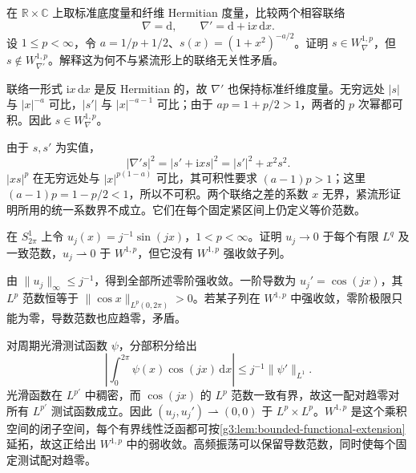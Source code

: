 \begin{exercise}\label{g3:ex:noncompact-connection-sobolev}
	在 \(\mathbb R\times\mathbb C\) 上取标准底度量和纤维 Hermitian 度量，比较两个相容联络
	\[
		\nabla=\mathrm d,\qquad\nabla'=\mathrm d+\mathrm i x\,\mathrm dx.
	\]
	设 \(1\le p<\infty\)，令 \(a=1/p+1/2\)、\(s(x)=(1+x^2)^{-a/2}\)。证明 \(s\in W^{1,p}_\nabla\)，但 \(s\notin W^{1,p}_{\nabla'}\)。解释这为何不与紧流形上的联络无关性矛盾。
\end{exercise}
\begin{solution}
	联络一形式 \(\mathrm ix\,\mathrm dx\) 是反 Hermitian 的，故 \(\nabla'\) 也保持标准纤维度量。无穷远处 \(|s|\) 与 \(|x|^{-a}\) 可比，\(|s'|\) 与 \(|x|^{-a-1}\) 可比；由于 \(ap=1+p/2>1\)，两者的 \(p\) 次幂都可积。因此 \(s\in W^{1,p}_\nabla\)。

	由于 \(s,s'\) 为实值，
	\[
		|\nabla's|^2=|s'+\mathrm ixs|^2=|s'|^2+x^2s^2.
	\]
	\(|xs|^p\) 在无穷远处与 \(|x|^{p(1-a)}\) 可比，其可积性要求 \((a-1)p>1\)；这里 \((a-1)p=1-p/2<1\)，所以不可积。两个联络之差的系数 \(x\) 无界，紧流形证明所用的统一系数界不成立。它们在每个固定紧区间上仍定义等价范数。
\end{solution}

\begin{exercise}\label{g3:ex:weak-strong-oscillation}
	在 \(S^1_{2\pi}\) 上令 \(u_j(x)=j^{-1}\sin(jx)\)，\(1<p<\infty\)。证明 \(u_j\to0\) 于每个有限 \(L^q\) 及一致范数，\(u_j\rightharpoonup0\) 于 \(W^{1,p}\)，但它没有 \(W^{1,p}\) 强收敛子列。
\end{exercise}
\begin{solution}
	由 \(\|u_j\|_\infty\le j^{-1}\)，得到全部所述零阶强收敛。一阶导数为 \(u_j'=\cos(jx)\)，其 \(L^p\) 范数恒等于 \(\|\cos x\|_{L^p(0,2\pi)}>0\)。若某子列在 \(W^{1,p}\) 中强收敛，零阶极限只能为零，导数范数也应趋零，矛盾。

	对周期光滑测试函数 \(\psi\)，分部积分给出
	\[
		\left|\int_0^{2\pi}\psi(x)\cos(jx)\,\mathrm dx\right|
		\le j^{-1}\|\psi'\|_{L^1}.
	\]
	光滑函数在 \(L^{p'}\) 中稠密，而 \(\cos(jx)\) 的 \(L^p\) 范数一致有界，故这一配对趋零对所有 \(L^{p'}\) 测试函数成立。因此 \((u_j,u_j')\rightharpoonup(0,0)\) 于 \(L^p\times L^p\)。\(W^{1,p}\) 是这个乘积空间的闭子空间，每个有界线性泛函都可按\cref{g3:lem:bounded-functional-extension}延拓，故这正给出 \(W^{1,p}\) 中的弱收敛。高频振荡可以保留导数范数，同时使每个固定测试配对趋零。
\end{solution}

